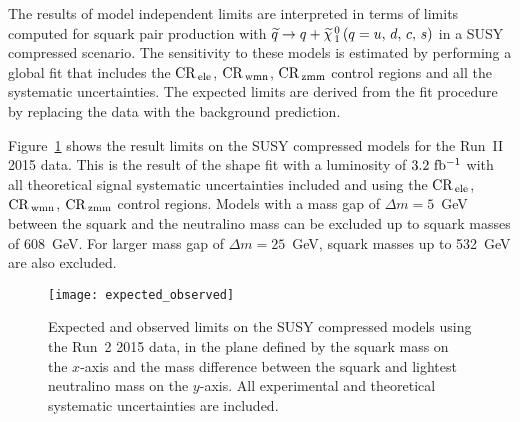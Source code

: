 The results of model independent limits are interpreted in terms of limits
computed for squark pair production with $\widetilde{q} \rightarrow q + \widetilde{\chi}_{\, 1}^{\, 0}\, (q = u,\, d,\, c,\, s)$ in a SUSY compressed
scenario. The sensitivity to these models is estimated by performing a global
fit that includes the $\mathrm{CR}_\mathrm{\, ele}$, $\mathrm{CR}_\mathrm{\, wmn}$, $\mathrm{CR}_\mathrm{\, zmm}$ control regions and all the
systematic uncertainties. The expected limits are derived from the fit procedure
by replacing the data with the background prediction.

Figure~\ref{fig:expected_observed} shows the result limits on the SUSY
compressed models for the Run~II 2015 data. This is the result of the shape fit
with a luminosity of $3.2~\mbox{fb$^{-1}$}$ with all theoretical signal systematic
uncertainties included and using the $\mathrm{CR}_\mathrm{\, ele}$, $\mathrm{CR}_\mathrm{\, wmn}$, $\mathrm{CR}_\mathrm{\, zmm}$ control
regions. Models with a mass gap of $\Delta m = 5$~GeV between the squark and the
neutralino mass can be excluded up to squark masses of 608~GeV. For larger mass
gap of $\Delta m = 25$~GeV, squark masses up to 532~GeV are also excluded.
\begin{figure}[!h]
  \centering
    \texttt{[image: expected\_observed]}
    \caption{Expected and observed limits on the SUSY compressed models using
      the Run~2 2015 data, in the plane defined by the squark mass on the
      $x$-axis and the mass difference between the squark and lightest
      neutralino mass on the $y$-axis. All experimental and theoretical
      systematic uncertainties are included.}
\label{fig:results:susy:compressed_observed}
    \label{fig:expected_observed}
\end{figure}

